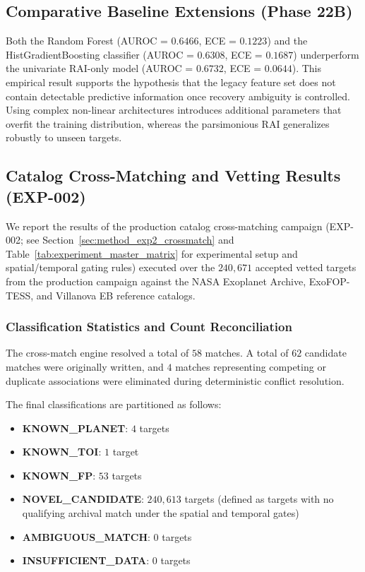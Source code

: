 \subsection{Comparative Baseline Extensions (Phase 22B)} \label{sec:comparative_baselines}

Both the Random Forest (AUROC = $0.6466$, ECE = $0.1223$) and the HistGradientBoosting classifier (AUROC = $0.6308$, ECE = $0.1687$) underperform the univariate RAI-only model (AUROC = $0.6732$, ECE = $0.0644$). This empirical result supports the hypothesis that the legacy feature set does not contain detectable predictive information once recovery ambiguity is controlled. Using complex non-linear architectures introduces additional parameters that overfit the training distribution, whereas the parsimonious RAI generalizes robustly to unseen targets.



\subsection{Catalog Cross-Matching and Vetting Results (EXP-002)} \label{sec:results_exp2_crossmatch}
We report the results of the production catalog cross-matching campaign (EXP-002; see Section~\ref{sec:method_exp2_crossmatch} and Table~\ref{tab:experiment_master_matrix} for experimental setup and spatial/temporal gating rules) executed over the $240,671$ accepted vetted targets from the production campaign against the NASA Exoplanet Archive, ExoFOP-TESS, and Villanova EB reference catalogs.

\subsubsection{Classification Statistics and Count Reconciliation}
The cross-match engine resolved a total of $58$ matches. A total of $62$ candidate matches were originally written, and $4$ matches representing competing or duplicate associations were eliminated during deterministic conflict resolution.

The final classifications are partitioned as follows:
\begin{itemize}
    \item \textbf{KNOWN\_PLANET}: $4$ targets
    \item \textbf{KNOWN\_TOI}: $1$ target
    \item \textbf{KNOWN\_FP}: $53$ targets
    \item \textbf{NOVEL\_CANDIDATE}: $240,613$ targets (defined as targets with no qualifying archival match under the spatial and temporal gates)
    \item \textbf{AMBIGUOUS\_MATCH}: $0$ targets
    \item \textbf{INSUFFICIENT\_DATA}: $0$ targets
\end{itemize}

